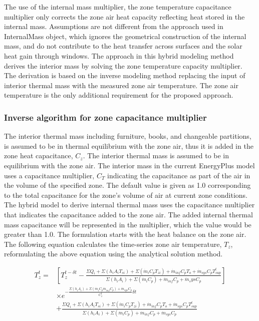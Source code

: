 \documentclass[11pt]{article}
\begin{document}
The use of the internal mass multiplier, the zone temperature capacitance multiplier only corrects the zone air heat capacity reflecting heat stored in the internal mass. Assumptions are not different from the approach used in InternalMass object, which ignores the geometrical construction of the internal mass, and do not contribute to the heat transfer across surfaces and the solar heat gain through windows.  The approach in this hybrid modeling method derives the interior mass by solving the zone temperature capacity multiplier. The derivation is based on the inverse modeling method replacing the input of interior thermal mass with the measured zone air temperature. The zone air temperature is the only additional requirement for the proposed approach.


\subsubsection{Inverse algorithm for zone capacitance multiplier}\label{Inverse-algorithm-for-zone-capacitance-multiplier}

The interior thermal mass including furniture, books, and changeable partitions, is assumed to be in thermal equilibrium with the zone air, thus it is added in the zone heat capacitance, $C_z$.  The interior thermal mass is assumed to be in equilibrium with the zone air. The interior mass in the current EnergyPlus model uses a capacitance multiplier, $C_T$ indicating the capacitance as part of the air in the volume of the specified zone. The default value is given as 1.0 corresponding to the total capacitance for the zone's volume of air at current zone conditions. The hybrid model to derive internal thermal mass uses the capacitance multiplier that indicates the capacitance added to the zone air. The added internal thermal mass capacitance will be represented in the multiplier, which the value would be greater than 1.0. The formulation starts with the heat balance on the zone air. The following equation calculates the time-series zone air temperature, $T_z$, reformulating the above equation using the analytical solution method.

\begin{equation}
\begin{aligned}
T_z^t = &\left[T_z^{t-\delta t} - \frac {\Sigma Q_i + \Sigma (h_i A_i T_{si}) + \Sigma (\dot{m}_i C_p T_{zi}) +\dot{m}_{inf} C_p T_o + \dot{m}_{sys} C_pT_{sup}^t} {\Sigma (h_i A_i)  + \Sigma(\dot{m}_i C_p) + \dot{m}_{inf} C_p + \dot{m}_sys C_p}\right]\\ &\times e^{ - \frac {\Sigma (h_i A_i) + \Sigma (\dot{m}_i C_p \dot{m}_{inf} C_p)+ \dot{m}_{sys} C_p} {C_z^t } \delta t} \\ &+ \frac {\Sigma Q_i +\Sigma(h_i A_i T_{si}) + \Sigma(\dot{m}_i C_p T_{zi}) + \dot{m}_{inf} C_p T_o + \dot{m}_{sys} C_p T_{sup}^t} {\Sigma(h_i A_i) +\Sigma(\dot{m}_i C_p)  + \dot{m}_{inf} C_p + \dot{m}_{sys} C_p }
\end{aligned}
\end{equation}
\end{document}

